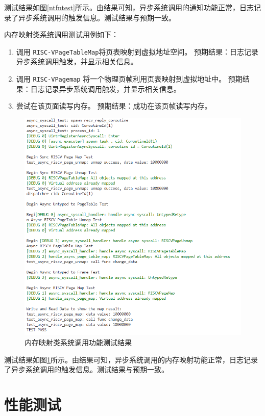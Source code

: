 测试结果如图\ref{ntfntest}所示。由结果可知，异步系统调用的通知功能正常，日志记录了异步系统调用的触发信息。测试结果与预期一致。

内存映射类系统调用测试用例如下：
\begin{enumerate}
  \item 调用 \texttt{RISC-VPageTableMap}将页表映射到虚拟地址空间。
        预期结果：日志记录异步系统调用触发，并显示相关信息。
  \item 调用 \texttt{RISC-VPagemap} 将一个物理页帧利用页表映射到虚拟地址中。
        预期结果：日志记录异步系统调用触发，并显示相关信息。
  \item 尝试在该页面读写内存。
        预期结果：成功在该页帧读写内存。
\end{enumerate}


\begin{figure}[htbp]
  \centering
  \includegraphics[width=\textwidth]{images/memtest.png}
  \caption{内存映射类系统调用功能测试结果}\label{memtest}
\end{figure}

测试结果如图\ref{memtest}所示。由结果可知，异步系统调用的内存映射功能正常，日志记录了异步系统调用的触发信息。测试结果与预期一致。

\section{性能测试}


